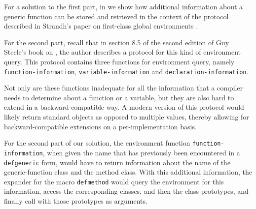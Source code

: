 For a solution to the first part, in  we show how
additional information about a generic function can be stored and
retrieved in the context of the protocol described in Strandh's paper
on first-class global environments
\cite{Strandh:2015:ELS:Environments}.

For the second part, recall that in section 8.5 of the second edition
of Guy Steele's book on \commonlisp{} \cite{Steele:1990:CLL:95411},
the author describes a protocol for this kind of environment query.
This protocol contains three functions for environment query, namely
\texttt{function-information}, \texttt{variable-information} and
  \texttt{declaration-information}.

Not only are these functions inadequate for all the information that a
compiler needs to determine about a function or a variable, but they
are also hard to extend in a backward-compatible way.  A modern
version of this protocol would likely return standard objects as
opposed to multiple values, thereby allowing for backward-compatible
extensions on a per-implementation basis.

For the second part of our solution, the environment function
\texttt{function-information}, when given the name that has previously
been encountered in a \texttt{defgeneric} form, would have to return
information about the name of the generic-function class and the
method class.  With this additional information, the expander for the
macro \texttt{defmethod} would query the environment for this
information, access the corresponding classes, and then the class
prototypes, and finally call \mml{} with those prototypes as
arguments.
